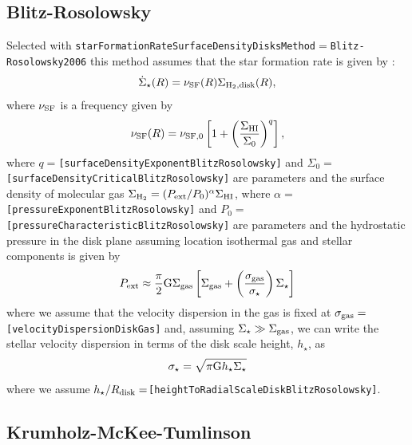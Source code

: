 \subsection{Blitz-Rosolowsky}\label{sec:StarFormationBlitzRosolowsky}

Selected with {\tt starFormationRateSurfaceDensityDisksMethod}$=${\tt Blitz-Rosolowsky2006} this method assumes that the star formation rate is given by \citep{blitz_role_2006}:
\begin{equation}
 \dot{\Sigma}_\star(R) = \nu_{\rm SF}(R) \Sigma_{\rm H_2, disk}(R),
\end{equation}
where $\nu_{\rm SF}$ is a frequency given by
\begin{equation}
 \nu_{\rm SF}(R) = \nu_{\rm SF,0} \left[ 1 + \left({\Sigma_{\rm HI}\over \Sigma_0}\right)^q \right],
\end{equation}
where $q=${\tt [surfaceDensityExponentBlitzRosolowsky]} and $\Sigma_0=${\tt [surfaceDensityCriticalBlitzRosolowsky]} are parameters and the surface density of molecular gas $\Sigma_{\rm H_2} = (P_{\rm ext}/P_0)^\alpha \Sigma_{\rm HI}$, where $\alpha=${\tt [pressureExponentBlitzRosolowsky]} and $P_0=${\tt [pressureCharacteristicBlitzRosolowsky]} are parameters and the hydrostatic pressure in the disk plane assuming location isothermal gas and stellar components is given by
\begin{equation}
 P_{\rm ext} \approx {\pi\over 2} \G \Sigma_{\rm gas} \left[ \Sigma_{\rm gas} + \left({\sigma_{\rm gas}\over \sigma_\star}\right)\Sigma_\star\right]
\end{equation}
where we assume that the velocity dispersion in the gas is fixed at $\sigma_{\rm gas}=${\tt [velocityDispersionDiskGas]} and, assuming $\Sigma_\star \gg \Sigma_{\rm gas}$, we can write the stellar velocity dispersion in terms of the disk scale height, $h_\star$, as
\begin{equation}
 \sigma_\star = \sqrt{\pi \G h_\star \Sigma_\star}
\end{equation}
where we assume $h_\star/R_{\rm disk}=${\tt [heightToRadialScaleDiskBlitzRosolowsky]}.

\subsection{Krumholz-McKee-Tumlinson}\label{sec:StarFormationKMT09}

